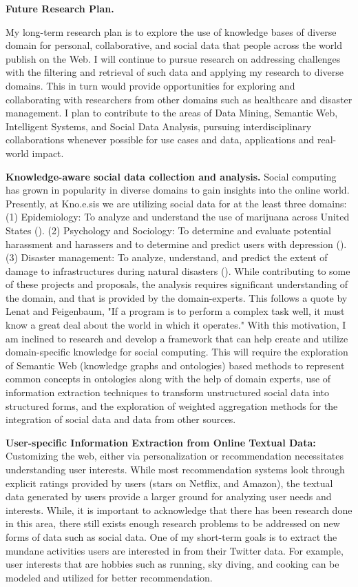 \documentclass[12pt]{letter} %
\begin{document}
\vspace{1.0em} 
\textbf{Future Research Plan.}
\vspace{0.3em}

My long-term research plan is to explore the use of knowledge bases of diverse domain for personal, collaborative, and social data that people across the world publish on the Web. I will continue to pursue research on addressing challenges with the filtering and retrieval of such data and applying my research to diverse domains. This in turn would provide opportunities for exploring and collaborating with researchers from other domains such as healthcare and disaster management. I plan to contribute to the areas of Data Mining, Semantic Web, Intelligent Systems, and Social Data Analysis, pursuing interdisciplinary collaborations whenever possible for use cases and data, applications and real-world impact.

\textbf{Knowledge-aware social data collection and analysis.}
Social computing has grown in popularity in diverse domains to gain insights into the online world. Presently, at Kno.e.sis we are utilizing social data for at the least three domains: (1) Epidemiology: To analyze and understand the use of marijuana across United States (). (2) Psychology and Sociology: To determine and evaluate potential harassment and harassers and to determine and predict users with depression (). (3) Disaster management: To analyze, understand, and predict the extent of damage to infrastructures during natural disasters (). While contributing to some of these projects and proposals, the analysis requires significant understanding of the  domain, and that is provided by the domain-experts. This follows a quote by Lenat and Feigenbaum, "If a program is to perform a complex task well, it must know a great deal about the world in which it operates." With this motivation, I am inclined to research and develop a framework that can help create and utilize domain-specific knowledge for social computing.  This will require the exploration of Semantic Web (knowledge graphs and ontologies) based methods to represent common concepts in ontologies along with the help of domain experts, use of information extraction techniques to transform unstructured social data into structured forms, and the exploration of weighted aggregation methods for the integration of social data and data from other sources.

\textbf{User-specific Information Extraction from Online Textual Data: } Customizing the web, either via personalization or recommendation necessitates understanding user interests. While most recommendation systems look through explicit ratings provided by users (stars on Netflix, and Amazon), the textual data generated by users provide a larger ground for analyzing user needs and interests. While, it is important to acknowledge that there has been research done in this area, there still exists enough research problems to be addressed on new forms of data such as social data. One of my short-term goals is to extract the mundane activities users are interested in from their Twitter data. For example, user interests that are hobbies such as running, sky diving, and cooking can be modeled and utilized for better recommendation.
\end{document}
